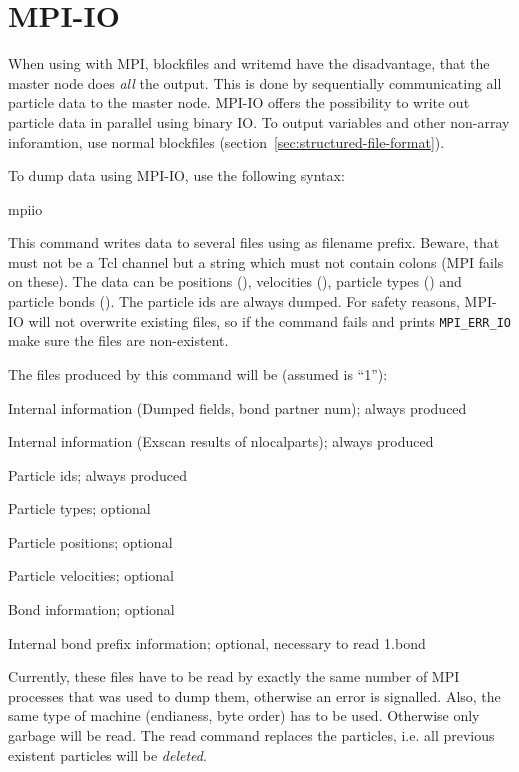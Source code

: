 \section{MPI-IO}

When using \es with MPI, blockfiles and writemd have the disadvantage,
that the master node does \textit{all} the output. This is done by
sequentially communicating all particle data to the master node. MPI-IO
offers the possibility to write out particle data in parallel using
binary IO. To output variables and other non-array inforamtion, use
normal blockfiles (section~\ref{sec:structured-file-format}).

To dump data using MPI-IO, use the following syntax:
\begin{essyntax}
  mpiio   
\end{essyntax}
This command writes data to several files using  as
filename prefix. Beware, that  must not be a Tcl channel
but a string which must not contain colons (MPI fails on these). The
data can be positions (), velocities (),
particle types () and particle bonds (). The
particle ids are always dumped. For safety reasons, MPI-IO will not
overwrite existing files, so if the command fails and prints
\texttt{MPI_ERR_IO} make sure the files are non-existent.

The files produced by this command will be (assumed  is
``1''):
\begin{description}[align=right,labelwidth=2cm]
  \item [1.head] Internal information (Dumped fields, bond partner num); always produced
  \item [1.pref] Internal information (Exscan results of nlocalparts);
    always produced
  \item [1.ids] Particle ids; always produced
  \item [1.type] Particle types; optional
  \item [1.pos] Particle positions; optional
  \item [1.vel] Particle velocities; optional
  \item [1.bond] Bond information; optional
  \item [1.boff] Internal bond prefix information; optional, necessary
    to read 1.bond
\end{description}

Currently, these files have to be read by exactly the same number of MPI
processes that was used to dump them, otherwise an error is
signalled. Also, the same type of machine (endianess, byte order) has to
be used. Otherwise only garbage will be read. The read command replaces
the particles, i.e. all previous existent particles will be
\textit{deleted}.

